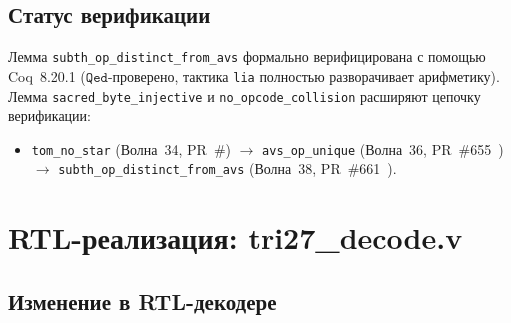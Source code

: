 \subsection{Статус верификации}

Лемма \texttt{subth\_op\_distinct\_from\_avs} формально верифицирована
с помощью Coq~8.20.1 ($\mathtt{Qed}$-проверено, тактика \texttt{lia}
полностью разворачивает арифметику).  Лемма \texttt{sacred\_byte\_injective}
и \texttt{no\_opcode\_collision} расширяют цепочку верификации:

\begin{itemize}
  \item \texttt{tom\_no\_star} (Волна~34, PR~\#<lane-y-sha>)
    $\to$ \texttt{avs\_op\_unique} (Волна~36, PR~\#655~\cite{pr655_t27})
    $\to$ \texttt{subth\_op\_distinct\_from\_avs}
    (Волна~38, PR~\#661~\cite{pr661_t27}).
\end{itemize}

\section{RTL-реализация: tri27\_decode.v}
\label{sec:rtl}


\subsection{Изменение в RTL-декодере}

